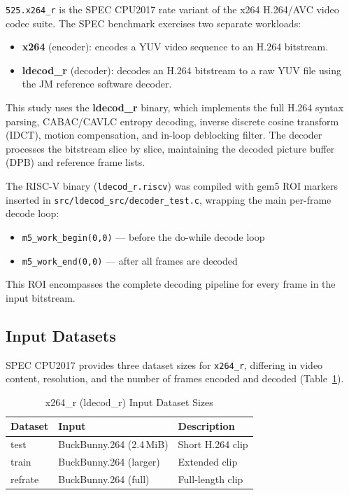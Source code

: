 \documentclass[conference]{IEEEtran}
\begin{document}
\texttt{525.x264\_r} is the SPEC CPU2017 rate variant of the x264
H.264/AVC video codec suite. The SPEC benchmark exercises two
separate workloads:
\begin{itemize}
    \item \textbf{x264} (encoder): encodes a YUV video sequence to
          an H.264 bitstream.
    \item \textbf{ldecod\_r} (decoder): decodes an H.264 bitstream to
          a raw YUV file using the JM reference software decoder.
\end{itemize}
This study uses the \textbf{ldecod\_r} binary, which implements the
full H.264 syntax parsing, CABAC/CAVLC entropy decoding, inverse
discrete cosine transform (IDCT), motion compensation, and in-loop
deblocking filter. The decoder processes the bitstream slice by slice,
maintaining the decoded picture buffer (DPB) and reference frame lists.

The RISC-V binary (\texttt{ldecod\_r.riscv}) was compiled with gem5
ROI markers inserted in \texttt{src/ldecod\_src/decoder\_test.c},
wrapping the main per-frame decode loop:

\begin{itemize}
    \item \texttt{m5\_work\_begin(0,0)} --- before the do-while decode loop
    \item \texttt{m5\_work\_end(0,0)}   --- after all frames are decoded
\end{itemize}

This ROI encompasses the complete decoding pipeline for every frame
in the input bitstream.

\subsection{Input Datasets}

SPEC CPU2017 provides three dataset sizes for \texttt{x264\_r},
differing in video content, resolution, and the number of frames
encoded and decoded (Table~\ref{tab:inputs}).

\begin{table}[H]
\centering
\caption{x264\_r (ldecod\_r) Input Dataset Sizes}
\label{tab:inputs}
\begin{tabular}{lll}
\toprule
\textbf{Dataset} & \textbf{Input} & \textbf{Description} \\
\midrule
test    & BuckBunny.264 (2.4\,MiB)  & Short H.264 clip \\
train   & BuckBunny.264 (larger)    & Extended clip \\
refrate & BuckBunny.264 (full)      & Full-length clip \\
\bottomrule
\end{tabular}
\end{table}
\end{document}
